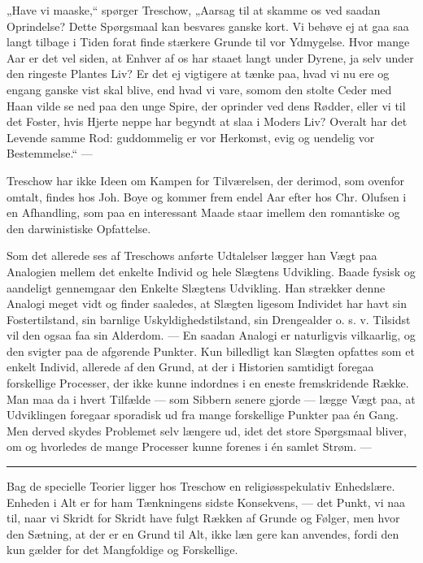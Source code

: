 \documentclass[12pt,a4paper,openany]{book}
\newcommand{\opage}[1]{\marginnote{\footnotesize\textit{[#1]}}}
\begin{document}
„Have vi maaske,“ spørger Treschow, „Aarsag til at skamme os ved saadan
Oprindelse? Dette Spørgsmaal kan besvares ganske kort. Vi behøve ej at gaa saa
langt tilbage i Tiden forat finde stærkere Grunde til vor Ydmygelse. Hvor mange
Aar er det vel siden, at Enhver af os har staaet langt under Dyrene, ja selv
under den ringeste Plantes Liv? Er det ej vigtigere at tænke paa, hvad vi nu
ere og engang ganske vist
\setcounter{footnote}{0}%
\opage{94}skal blive, end hvad vi vare, somom den stolte Ceder med Haan vilde
se ned paa den unge Spire, der oprinder ved dens Rødder, eller vi til det
Foster, hvis Hjerte neppe har begyndt at slaa i Moders Liv? Overalt har det
Levende samme Rod: guddommelig er vor Herkomst, evig og uendelig vor
Bestemmelse.“ ---

Treschow har ikke Ideen om Kampen for Tilværelsen, der derimod, som ovenfor
omtalt, findes hos Joh. Boye og kommer frem endel Aar efter hos Chr. Olufsen i
en Afhandling, som paa en interessant Maade staar imellem den romantiske og den
darwinistiske Opfattelse.

Som det allerede ses af Treschows anførte Udtalelser lægger han Vægt paa
Analogien mellem det enkelte Individ og hele Slægtens Udvikling. Baade fysisk
og aandeligt gennemgaar den Enkelte Slægtens Udvikling. Han strækker denne
Analogi meget vidt og finder saaledes, at Slægten ligesom Individet har havt
sin Fostertilstand, sin barnlige Uskyldighedstilstand, sin Drengealder o. s. v.
Tilsidst vil den ogsaa faa sin Alderdom. --- En saadan Analogi er naturligvis
vilkaarlig, og den svigter paa de afgørende Punkter. Kun billedligt kan Slægten
opfattes som et enkelt Individ, allerede af den Grund, at der i Historien
samtidigt foregaa forskellige Processer, der ikke kunne indordnes i en eneste
fremskridende Række. Man maa da i hvert Tilfælde --- som Sibbern senere gjorde
--- lægge Vægt paa, at Udviklingen foregaar sporadisk ud fra mange forskellige
Punkter paa én Gang. Men derved skydes Problemet selv længere ud, idet det
store Spørgsmaal bliver, om og hvorledes de mange Processer kunne forenes i én
samlet Strøm. ---

\begin{center}\rule{2cm}{0.4pt}\end{center}

Bag de specielle Teorier ligger hos Treschow en religiøsspekulativ Enhedslære.
Enheden i Alt er for ham Tænkningens sidste Konsekvens, --- det Punkt, vi naa
til, naar vi Skridt for Skridt have fulgt Rækken af Grunde og Følger, men hvor
den Sætning, at der er en Grund til Alt, ikke læn%
\setcounter{footnote}{0}%
\opage{95}gere kan anvendes, fordi den kun gælder for det Mangfoldige og Forskellige.
\end{document}
